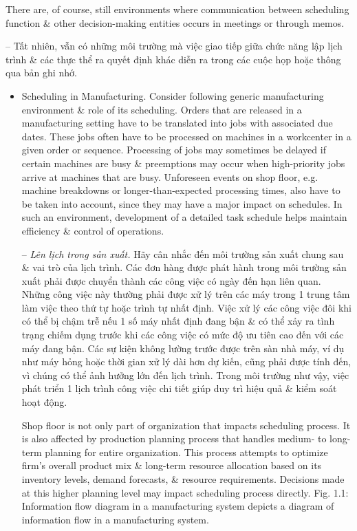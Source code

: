 \documentclass{article}
\begin{document}
\begin{itemize}
\begin{itemize}
        There are, of course, still environments where communication between scheduling function \& other decision-making entities occurs in meetings or through memos.

        -- Tất nhiên, vẫn có những môi trường mà việc giao tiếp giữa chức năng lập lịch trình \& các thực thể ra quyết định khác diễn ra trong các cuộc họp hoặc thông qua bản ghi nhớ.
        \begin{itemize}
            \item {\sf Scheduling in Manufacturing.} Consider following generic manufacturing environment \& role of its scheduling. Orders that are released in a manufacturing setting have to be translated into jobs with associated due dates. These jobs often have to be processed on machines in a workcenter in a given order or sequence. Processing of jobs may sometimes be delayed if certain machines are busy \& preemptions may occur when high-priority jobs arrive at machines that are busy. Unforeseen events on shop floor, e.g. machine breakdowns or longer-than-expected processing times, also have to be taken into account, since they may have a major impact on schedules. In such an environment, development of a detailed task schedule helps maintain efficiency \& control of operations.

            -- {\it Lên lịch trong sản xuất.} Hãy cân nhắc đến môi trường sản xuất chung sau \& vai trò của lịch trình. Các đơn hàng được phát hành trong môi trường sản xuất phải được chuyển thành các công việc có ngày đến hạn liên quan. Những công việc này thường phải được xử lý trên các máy trong 1 trung tâm làm việc theo thứ tự hoặc trình tự nhất định. Việc xử lý các công việc đôi khi có thể bị chậm trễ nếu 1 số máy nhất định đang bận \& có thể xảy ra tình trạng chiếm dụng trước khi các công việc có mức độ ưu tiên cao đến với các máy đang bận. Các sự kiện không lường trước được trên sàn nhà máy, ví dụ như máy hỏng hoặc thời gian xử lý dài hơn dự kiến, cũng phải được tính đến, vì chúng có thể ảnh hưởng lớn đến lịch trình. Trong môi trường như vậy, việc phát triển 1 lịch trình công việc chi tiết giúp duy trì hiệu quả \& kiểm soát hoạt động.

            Shop floor is not only part of organization that impacts scheduling process. It is also affected by production planning process that handles medium- to long-term planning for entire organization. This process attempts to optimize firm's overall product mix \& long-term resource allocation based on its inventory levels, demand forecasts, \& resource requirements. Decisions made at this higher planning level may impact scheduling process directly. {\sf Fig. 1.1: Information flow diagram in a manufacturing system} depicts a diagram of information flow in a manufacturing system.


\end{itemize}
\end{itemize}
\end{itemize}
\end{document}
